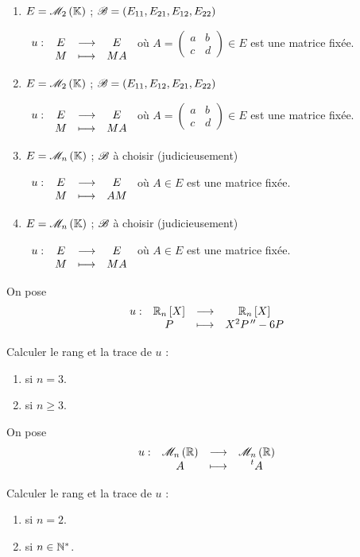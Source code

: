 \begin{exo}[Exercice 1]
\begin{enumerate}
\item \(E=\M{2}\) ; \(\mathscr{B}=\left(E_{11},E_{21},E_{12},E_{22}\right)\)

\(\begin{array}[t]{cccc}u : & E & \longrightarrow & E \\ & M & \longmapsto & MA\end{array}\) où \(A=\begin{pmatrix}
a & b \\
c & d
\end{pmatrix}\in E\) est une matrice fixée. \\

\item \(E=\M{2}\) ; \(\mathscr{B}=\left(E_{11},E_{12},E_{21},E_{22}\right)\)

\(\begin{array}[t]{cccc}u : & E & \longrightarrow & E \\ & M & \longmapsto & MA\end{array}\) où \(A=\begin{pmatrix}
a & b \\
c & d
\end{pmatrix}\in E\) est une matrice fixée. \\

\item \(E=\M{n}\) ; \(\mathscr{B}\) à choisir (judicieusement)

\(\begin{array}[t]{cccc}u : & E & \longrightarrow & E \\ & M & \longmapsto & AM\end{array}\) où \(A\in E\) est une matrice fixée. \\

\item \(E=\M{n}\) ; \(\mathscr{B}\) à choisir (judicieusement)

\(\begin{array}[t]{cccc}u : & E & \longrightarrow & E \\ & M & \longmapsto & MA\end{array}\) où \(A\in E\) est une matrice fixée.
\end{enumerate}
\end{exo}

\begin{corr}
\end{corr}

\begin{exo}[Exercice 2]
On pose \[\fonction{u}{\polydeg[\R]{n}}{\polydeg[\R]{n}}{P}{X^2P\seconde-6P}\]

Calculer le rang et la trace de \(u\) :

\begin{enumerate}
\item si \(n=3\). \\

\item si \(n\geq3\).
\end{enumerate}
\end{exo}

\begin{corr}
\end{corr}

\begin{exo}[Exercice 3]
On pose \[\fonction{u}{\M{n}[\R]}{\M{n}[\R]}{A}{\trans{A}}\]

Calculer le rang et la trace de \(u\) :

\begin{enumerate}
\item si \(n=2\). \\

\item si \(n\in\mathbb{N}^*\).
\end{enumerate}
\end{exo}

